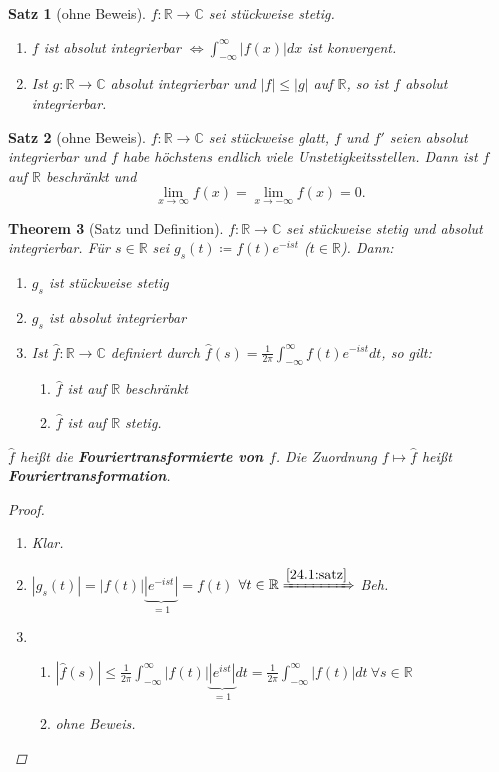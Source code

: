 \documentclass[12pt]{extreport} %
\newcommand{\C}{\mathbb{C}}
\newcommand{\R}{\mathbb{R}}
\theoremstyle{named}
\newtheorem{unnamedtheorem}{Theorem} \counterwithin{unnamedtheorem}{chapter}
\theoremstyle{nnamed}
\theoremstyle{itshape}
\newtheorem{satz}[unnamedtheorem]{Satz}
\theoremstyle{normal}
\begin{document}
\begin{satz}[ohne Beweis] \label{24.1:satz}
	$f \colon \R \rightarrow \C$ sei stückweise stetig.
	\begin{enumerate}
		\item $f$ ist absolut integrierbar $\iff \int_{-\infty}^{\infty} |f(x)| dx$ ist konvergent.
		\item Ist $g \colon \R \rightarrow \C$ absolut integrierbar und $|f| \leq |g|$ auf $\R$, so ist $f$ absolut integrierbar.
	\end{enumerate}	
\end{satz}


\begin{satz}[ohne Beweis] \label{24.2.satz}
	$f \colon \R \rightarrow \C$ sei stückweise glatt, $f$ und $f'$ seien absolut integrierbar und $f$ habe höchstens endlich viele Unstetigkeitsstellen. Dann ist $f$ auf $\R$ beschränkt und	
	$$ \lim_{x \rightarrow \infty} f(x) = \lim_{x \rightarrow -\infty} f(x) = 0. $$
\end{satz}

\begin{unnamedtheorem}[Satz und Definition] \label{24.3:satz}
	$f \colon \R \rightarrow \C$ sei stückweise stetig und absolut integrierbar. Für $s \in \R$ sei $g_{s}(t) \coloneqq f(t) e^{-ist}$ ($t \in \R$). Dann:
	\begin{enumerate}
		\item $g_{s}$ ist stückweise stetig
		\item $g_{s}$ ist absolut integrierbar
		\item Ist $\hat{f} \colon \R \rightarrow \C$ definiert durch $\hat{f}(s) = \frac{1}{2\pi} \int_{-\infty}^{\infty} f(t) e^{-ist} dt$, so gilt: 
			\begin{enumerate}
				\item $\hat{f}$ ist auf $\R$ beschränkt
				\item $\hat{f}$ ist auf $\R$ stetig.
			\end{enumerate}
	\end{enumerate}
	$\hat{f}$ hei{\ss}t die \textbf{Fouriertransformierte von $f$}. Die Zuordnung $f \mapsto \hat{f}$ hei{\ss}t \textbf{Fouriertransformation}.
	
	\begin{proof} ~\
		\begin{enumerate}
			\item Klar.
			\item $|g_{s}(t)| = |f(t)| \underbrace{\left|e^{-ist}\right|}_{= 1} = f(t)$ $\forall t \in \R \xRightarrow[]{\ref{24.1:satz}}$ Beh.
			\item \begin{enumerate}
					\item $\left| \hat{f}(s) \right| \leq \frac{1}{2\pi} \int_{-\infty}^{\infty} |f(t)| \underbrace{\left| e^{ist} \right|}_{= 1} dt = \frac{1}{2\pi} \int_{-\infty}^{\infty} |f(t)| dt ~\forall s \in \R$
					\item ohne Beweis.
				  \end{enumerate}
		\end{enumerate}
	\end{proof}
\end{unnamedtheorem}
\end{document}
